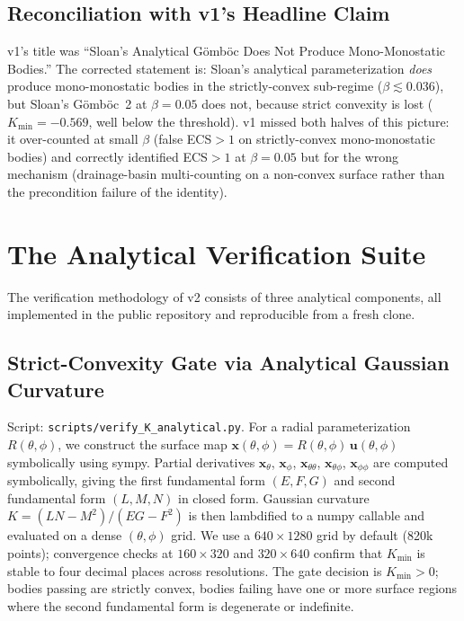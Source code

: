 \documentclass[11pt,a4paper]{article}
\begin{document}
\subsection{Reconciliation with v1's Headline Claim}
\label{sec:v1_reconciliation}

v1's title was ``Sloan's Analytical G\"omb\"oc Does Not Produce
Mono-Monostatic Bodies.'' The corrected statement is: Sloan's
analytical parameterization \emph{does} produce mono-monostatic
bodies in the strictly-convex sub-regime ($\beta \lesssim 0.036$), but
Sloan's G\"omb\"oc~2 at $\beta = 0.05$ does not, because
strict convexity is lost ($K_{\min} = -0.569$, well below the threshold). v1 missed both halves of this picture: it
over-counted at small $\beta$ (false ECS$>1$ on strictly-convex
mono-monostatic bodies) and correctly identified ECS$>1$ at
$\beta = 0.05$ but for the wrong mechanism (drainage-basin
multi-counting on a non-convex surface rather than the precondition
failure of the identity).

\section{The Analytical Verification Suite}
\label{sec:verification_suite}

The verification methodology of v2 consists of three analytical
components, all implemented in the public repository and reproducible
from a fresh clone.

\subsection{Strict-Convexity Gate via Analytical Gaussian Curvature}
\label{sec:K_analytical}

Script: \texttt{scripts/verify\_K\_analytical.py}.
For a radial parameterization $R(\theta,\phi)$, we construct the
surface map $\mathbf{x}(\theta,\phi) = R(\theta,\phi)\,\mathbf{u}(\theta,\phi)$
symbolically using sympy. Partial derivatives $\mathbf{x}_\theta$,
$\mathbf{x}_\phi$, $\mathbf{x}_{\theta\theta}$, $\mathbf{x}_{\theta\phi}$,
$\mathbf{x}_{\phi\phi}$ are computed symbolically, giving the first
fundamental form $(E, F, G)$ and second fundamental form $(L, M, N)$
in closed form. Gaussian curvature $K = (LN - M^2)/(EG - F^2)$ is
then lambdified to a numpy callable and evaluated on a dense
$(\theta, \phi)$ grid. We use a $640 \times 1280$ grid by default
(820k points); convergence checks at $160\times320$ and $320\times640$
confirm that $K_{\min}$ is stable to four decimal places across
resolutions. The gate decision is $K_{\min} > 0$; bodies passing
are strictly convex, bodies failing have one or more surface
regions where the second fundamental form is degenerate or indefinite.
\end{document}
